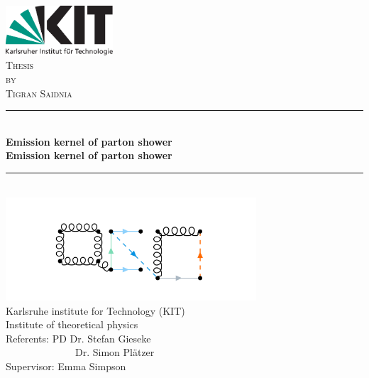 \begin{titlepage}

\begin{center}


\includegraphics[width=0.3\textwidth]{images/kitlogo_de_rgb}\\[1cm]    

\textsc{\LARGE Thesis}\\[0.5cm]
\textsc{\Large by}\\[0.5cm]
\textsc{\Large Tigran Saidnia}\\[1.5cm]


\newcommand{\HRule}{\rule{\linewidth}{0.5mm}}
\HRule \\[0.8mm]
{\textbf{\Large \bfseries Emission kernel of parton shower}}\\[0.8mm]

{\textbf{\bfseries Emission kernel of parton shower}}\\[0.8mm]

\HRule \\[1cm]
\includegraphics[width=0.7\textwidth]{images/pp.PNG}\\[1cm]   
\Large Karlsruhe institute for Technology (KIT)\\[1.5mm]
\Large Institute of theoretical physics\\[1.5cm]
\Large Referents: PD Dr. Stefan Gieseke \\
\Large ~~~~~~~~~~~~~~Dr. Simon Plätzer\\

\Large Supervisor: Emma Simpson\\

\vfill


\end{center}

\end{titlepage}